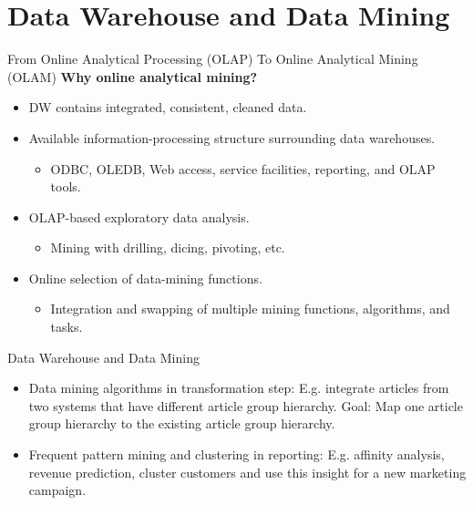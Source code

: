 \section{Data Warehouse and Data Mining}


\begin{frame}{From Online Analytical Processing (OLAP) To Online Analytical Mining (OLAM)}
	\textbf{Why online analytical mining?}
	\begin{itemize}
		\item DW contains integrated, consistent, cleaned data.
		\item Available information-processing structure surrounding data warehouses.
		      \begin{itemize}
			      \item ODBC, OLEDB, Web access, service facilities, reporting, and OLAP tools.
		      \end{itemize}
		\item OLAP-based exploratory data analysis.
		      \begin{itemize}
			      \item Mining with drilling, dicing, pivoting, etc.
		      \end{itemize}
		\item Online selection of data-mining functions.
		      \begin{itemize}
			      \item Integration and swapping of multiple mining functions, algorithms, and tasks.
		      \end{itemize}
	\end{itemize}
\end{frame}


\begin{frame}{Data Warehouse and Data Mining}
	\vspace*{-1em}
	

	\begin{itemize}
		\item Data mining algorithms in transformation step: E.g. integrate articles from two systems that have different article group hierarchy. Goal: Map one article group hierarchy to the existing article group hierarchy.
		\item Frequent pattern mining and clustering in reporting: E.g. affinity
		      analysis, revenue prediction, cluster customers and use this insight for a
		      new marketing campaign.
	\end{itemize}
\end{frame}
